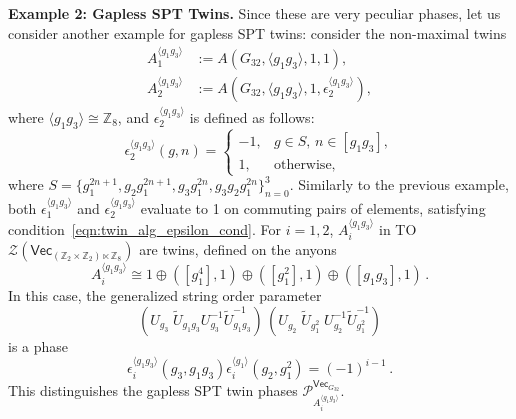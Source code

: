 \documentclass[aps,twocolumn,prx,floatfix,preprintnumbers, nofootinbib,10pt]{revtex4-2}
\numberwithin{equation}{section}
\theoremstyle{definition}
\newcommand{\be}{\begin{equation}}
\newcommand{\ee}{\end{equation}}
\newcommand{\wt}{\widetilde}
\newcommand{\Z}{{\mathbb Z}}
\newcommand{\cP}{\mathcal{P}}
\newcommand{\cZ}{\mathcal{Z}}
\renewcommand{\Vec}{\mathsf{Vec}}
\begin{document}
\vspace{2mm}
\noindent\textbf{Example 2: Gapless SPT Twins.} Since these are very peculiar phases, let us consider another example for gapless SPT twins: consider the non-maximal twins
\begin{align}
    A_1^{\langle g_1 g_3 \rangle} & := A(G_{32}, \langle g_1 g_3 \rangle, 1, 1), \\ 
    A_2^{\langle g_1 g_3 \rangle} & := A(G_{32}, \langle g_1 g_3 \rangle, 1, \epsilon^{\langle g_1 g_3 \rangle}_2),
\end{align}
where  
$\langle g_1 g_3 \rangle \cong \Z_8$, and $\epsilon^{\langle g_1 g_3 \rangle}_2$ is defined as follows:
\be
\label{eqn:G32,43esp_2^g1g3}
    \epsilon_2^{\langle g_1 g_3 \rangle}(g,n)=\begin{cases}
        -1, & g\in S,\, n\in [g_1 g_3], \\
        1, & \text{otherwise},
    \end{cases}
\ee
where $S=\{ g_1^{2n+1}, g_2 g_1^{2n+1}, g_3 g_1^{2n}, g_3 g_2 g_1^{2n} \}_{n=0}^{3}$. Similarly to the previous example, both $\epsilon_1^{\langle g_1 g_3 \rangle}$ and $\epsilon_2^{\langle g_1 g_3 \rangle}$ evaluate to 1 on commuting pairs of elements, satisfying condition~\eqref{eqn:twin_alg_epsilon_cond}. For $i=1,2$, $A_i^{\langle g_1 g_3 \rangle}$ in TO $\cZ(\Vec_{(\Z_2\times \Z_2) \ltimes \Z_8})$ are twins, defined on the anyons
\be
    A_i^{\langle g_1 g_3 \rangle} \cong 1 \oplus ([g_1^4],1) \oplus ([g_1^2], 1) \oplus ([g_1g_3],1)\, .
\ee
In this case, the generalized string order parameter
\be
      (U_{g_3}^{\phantom{-1}}\!\wt{U}_{g_1g_3}^{\phantom{-1}}U_{g_3}^{-1}\wt{U}_{g_1g_3}^{-1})\,
     (U_{g_2^{\phantom{2}}}^{\phantom{-1}}\!\!\wt{U}_{g_1^2}^{\phantom{-1}}\!U_{g_2^{\phantom{2}}}^{-1}\wt{U}_{g_1^2}^{-1}) 
\ee 
is a phase 
\be
    \epsilon_i^{\langle g_1g_3\rangle}(g_3, g_1g_3)\epsilon_i^{\langle g_1\rangle}(g_2, g_1^2) = (-1)^{i-1}\,.
\ee
This distinguishes the gapless SPT twin phases $\cP^{\Vec_{G_{32}}}_{A_i^{\langle g_1 g_3\rangle}}$.
\end{document}
